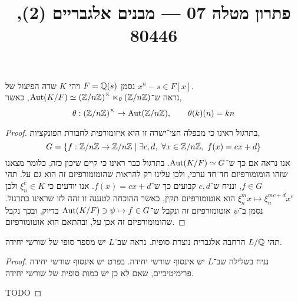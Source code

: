 
\title{פתרון מטלה 07 --- מבנים אלגבריים (2), 80446}


\maketitle
\maketitleprint[red]

\question{}
נסמן $F = \mathbb{Q}(s)$ ויהי $K$ שדה הפיצול של $x^n - s \in F[x]$. \\
נראה ש־$\operatorname{Aut}(K / F) \simeq {(\mathbb{Z}/ n \mathbb{Z})}^\times \ltimes_{\theta} (\mathbb{Z} / n \mathbb{Z})$, כאשר,
\[
	\theta : {(\mathbb{Z} / n \mathbb{Z})}^\times \to \operatorname{Aut}(\mathbb{Z} / n \mathbb{Z}),
	\qquad
	\theta(k)(n) = k n
\]
\begin{proof}
	בתרגול ראינו כי מכפלה חצי־ישרה זו היא איזומורפית לחבורת הפונקציות,
	\[
		G = \{ f : \mathbb{Z} / n \mathbb{Z} \to \mathbb{Z} / n \mathbb{Z} \mid \exists c, d,\ \forall x \in \mathbb{Z} / n \mathbb{Z},\ f(x) = cx + d \}
	\]
	אנו נראה אם כך ש־$\operatorname{Aut}(K / F) \simeq G$.
	בתרגול כבר ראינו כי קיים שיכון כזה, כלומר מצאנו שזהו הומומורפיזם חד־חד ערכי, ולכן עלינו רק להראות שהומומורפיזם זה הוא גם על.
	תהי $f \in G$, ונניח ש־$c, d$ קבועים כך ש־$f(x) = cx + d$.
	אנו יודעים כי $\xi_n^c \in K$ ולכן $\xi_n^m x \mapsto \xi_n^{mc + d} x^c$ הוא אוטומורפיזם תקין, כאשר ההוכחה לטענה זו זהה לזו שראינו בתרגול.
	נסמן ב־$\psi$ אוטומורפיזם זה ונקבל ש־$\operatorname{Aut}(K / F) \ni \psi \mapsto f \in G$ בדיוק, ובכך נקבל שהומומורפיזם זה אכן על, ובהתאם הוא אוטומורפיזם.
\end{proof}

\question{}
תהי $L / \mathbb{Q}$ הרחבה אלגברית נוצרת סופית.
נראה שב־$L$ יש מספר סופי של שורשי יחידה.
\begin{proof}
	נניח בשלילה שב־$L$ יש אינסוף שורשי יחידה.
	בפרט יש אינסוף שורשי יחידה פרימיטיביים, שאם לא כן יש כמות סופית של שורשי יחידה.

	TODO
\end{proof}


